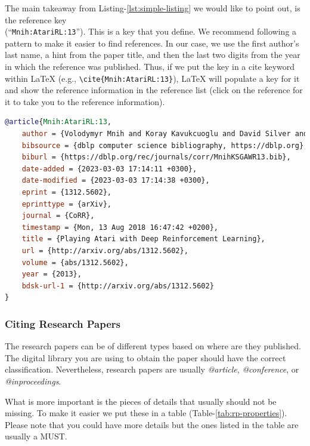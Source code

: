 The main takeaway from Listing-\ref{lst:simple-listing} we would like to point out, is the reference key\\(``\texttt{Mnih:AtariRL:13}''). This is a key that you define. We recommend following a pattern to make it easier to find references. In our case, we use the first author's last name, a hint from the paper title, and then the last two digits from the year in which the reference was published. Thus, if we put the key in a cite keyword within {\LaTeX} (e.g., \verb|\cite{Mnih:AtariRL:13}|), {\LaTeX} will populate a key for it and show the reference information in the reference list \cite{Mnih:AtariRL:13} (click on the reference for it to take you to the reference information).

\begin{lstlisting}[language=BibTex,style=mystyle,caption={Sample BibTex Reference Entry},label={lst:simple-listing}]
@article{Mnih:AtariRL:13,
    author = {Volodymyr Mnih and Koray Kavukcuoglu and David Silver and Alex Graves and Ioannis Antonoglou and Daan Wierstra and Martin A. Riedmiller},
    bibsource = {dblp computer science bibliography, https://dblp.org},
    biburl = {https://dblp.org/rec/journals/corr/MnihKSGAWR13.bib},
    date-added = {2023-03-03 17:14:11 +0300},
    date-modified = {2023-03-03 17:14:38 +0300},
    eprint = {1312.5602},
    eprinttype = {arXiv},
    journal = {CoRR},
    timestamp = {Mon, 13 Aug 2018 16:47:42 +0200},
    title = {Playing Atari with Deep Reinforcement Learning},
    url = {http://arxiv.org/abs/1312.5602},
    volume = {abs/1312.5602},
    year = {2013},
    bdsk-url-1 = {http://arxiv.org/abs/1312.5602}
}
\end{lstlisting}

\subsubsection{Citing Research Papers}

The research papers can be of different types based on where are they published. The digital library you are using to obtain the paper should have the correct classification. Nevertheless, research papers are usually \emph{@article}, \emph{@conference}, or \emph{@inproceedings}.

What is more important is the pieces of details that usually should not be missing. To make it easier we put these in a table (Table-\ref{tab:rp-properties}). Please note that you could have more details but the ones listed in the table are usually a MUST.


